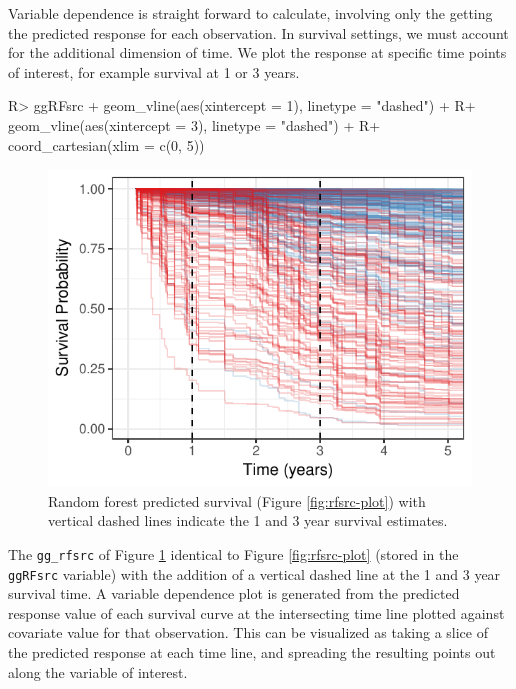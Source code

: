 \documentclass[article, nojss]{jss}
\begin{document}
Variable dependence is straight forward to calculate, involving only the
getting the predicted response for each observation. In survival
settings, we must account for the additional dimension of time. We plot
the response at specific time points of interest, for example survival
at 1 or 3 years.

\begin{Schunk}
\begin{Sinput}
R> ggRFsrc + geom_vline(aes(xintercept = 1), linetype = "dashed") +
R+    geom_vline(aes(xintercept = 3), linetype = "dashed") +
R+   coord_cartesian(xlim = c(0, 5))
\end{Sinput}
\begin{figure}[!htb]

{\centering \includegraphics{rfs-rfsrc-plot3Mnth-1}

}

\caption{Random forest predicted survival (Figure \ref{fig:rfsrc-plot}) with vertical dashed lines indicate the 1 and 3 year survival estimates.}\label{fig:rfsrc-plot3Mnth}
\end{figure}
\end{Schunk}

The \texttt{gg\_rfsrc} of Figure \ref{fig:rfsrc-plot3Mnth} identical to
Figure \ref{fig:rfsrc-plot} (stored in the \texttt{ggRFsrc} variable)
with the addition of a vertical dashed line at the 1 and 3 year survival
time. A variable dependence plot is generated from the predicted
response value of each survival curve at the intersecting time line
plotted against covariate value for that observation. This can be
visualized as taking a slice of the predicted response at each time
line, and spreading the resulting points out along the variable of
interest.
\end{document}
